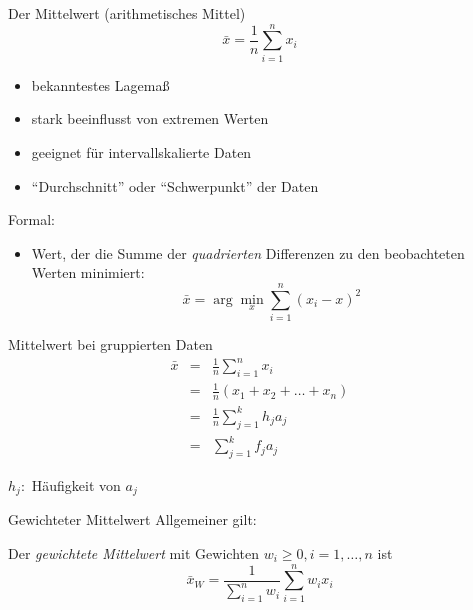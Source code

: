 \documentclass[
  10pt,
  ignorenonframetext,
]{beamer}
\providecommand{\tightlist}{%
  \setlength{\itemsep}{0pt}\setlength{\parskip}{0pt}}
\begin{document}
\begin{frame}{Der Mittelwert (arithmetisches Mittel)}
\protect\hypertarget{der-mittelwert-arithmetisches-mittel}{}
\begin{equation*}
      \bar x = \frac{1}{n} \sum_{i=1}^n x_i
\end{equation*}

\begin{itemize}
\tightlist
\item
  bekanntestes Lagemaß
\item
  stark beeinflusst von extremen Werten
\item
  geeignet für intervallskalierte Daten
\item
  ``Durchschnitt'' oder ``Schwerpunkt'' der Daten
\end{itemize}

Formal:

\begin{itemize}
\tightlist
\item
  Wert, der die Summe der \emph{quadrierten} Differenzen zu den
  beobachteten Werten minimiert:
  \[\bar x = \arg\min_x \sum^n_{i=1} (x_i - x)^2\]
\end{itemize}
\end{frame}

\begin{frame}{Mittelwert bei gruppierten Daten}
\protect\hypertarget{mittelwert-bei-gruppierten-daten}{}
\begin{eqnarray*}
  \bar x &=& \frac{1}{n} \sum_{i=1}^n x_i \\
             &=& \frac{1}{n}(x_1 + x_2 + \ldots + x_n) \\
             &=& \frac{1}{n} \sum_{j=1}^k h_j a_j \\
             &=& \sum_{j=1}^k f_j a_j
\end{eqnarray*}

\(h_j:\) Häufigkeit von \(a_j\)
\end{frame}

\begin{frame}{Gewichteter Mittelwert}
\protect\hypertarget{gewichteter-mittelwert}{}
Allgemeiner gilt:

Der \emph{gewichtete Mittelwert} mit Gewichten
\(w_i \geq 0, i= 1, \dots, n\) ist
\[\bar x_W = \frac{1}{\sum^n_{i=1} w_i} \sum^n_{i=1} w_i x_i\]
\end{frame}
\end{document}
